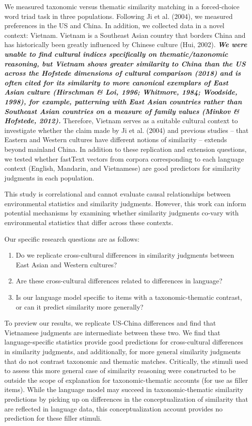 \documentclass[10pt, letterpaper]{article}
\begin{document}
We measured taxonomic versus thematic similarity matching in a
forced-choice word triad task in three populations. Following Ji et al.
(2004), we measured preferences in the US and China. In addition, we
collected data in a novel context: Vietnam. Vietnam is a Southeast Asian
country that borders China and has historically been greatly influenced
by Chinese culture (Hui, 2002). \textbf{\emph{We were unable to find
cultural indices specifically on thematic/taxonomic reasoning, but
Vietnam shows greater similarity to China than the US across the
Hofstede dimensions of cultural comparison (2018) and is often cited for
its similarity to more canonical exemplars of East Asian culture
(Hirschman \& Loi, 1996; Whitmore, 1984; Woodside, 1998), for example,
patterning with East Asian countries rather than Southeast Asian
countries on a measure of family values (Minkov \& Hofstede, 2012).}}
Therefore, Vietnam serves as a suitable cultural context to investigate
whether the claim made by Ji et al. (2004) and previous studies -- that
Eastern and Western cultures have different notions of similarity --
extends beyond mainland China. In addition to these replication and
extension questions, we tested whether fastText vectors from corpora
corresponding to each language context (English, Mandarin, and
Vietnamese) are good predictors for similarity judgments in each
population.

This study is correlational and cannot evaluate causal relationships
between environmental statistics and similarity judgments. However, this
work can inform potential mechanisms by examining whether similarity
judgments co-vary with environmental statistics that differ across these
contexts.

Our specific research questions are as follows:

\begin{enumerate}
\def\labelenumi{\arabic{enumi}.}
\item
  Do we replicate cross-cultural differences in similarity judgments
  between East Asian and Western cultures?
\item
  Are these cross-cultural differences related to differences in
  language?
\item
  Is our language model specific to items with a taxonomic-thematic
  contrast, or can it predict similarity more generally?
\end{enumerate}

To preview our results, we replicate US-China differences and find that
Vietnamese judgments are intermediate between these two. We find that
language-specific statistics provide good predictions for cross-cultural
differences in similarity judgments, and additionally, for more general
similarity judgments that do not contrast taxonomic and thematic
matches. Critically, the stimuli used to assess this more general case
of similarity reasoning were constructed to be outside the scope of
explanation for taxonomic-thematic accounts (for use as filler items).
While the language model may succeed in taxonomic-thematic similarity
predictions by picking up on differences in the conceptualization of
similarity that are reflected in language data, this conceptualization
account provides no prediction for these filler stimuli.
\end{document}
